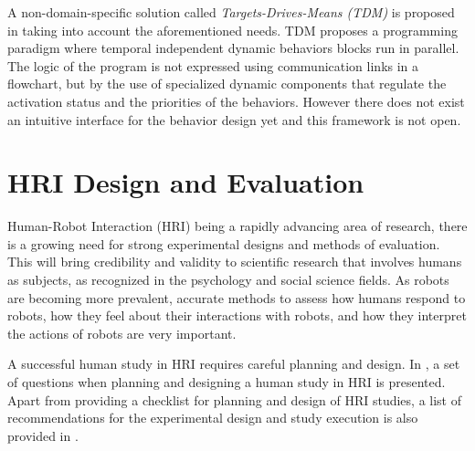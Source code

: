 A non-domain-specific solution called \emph{Targets-Drives-Means (TDM)} is proposed in \cite{berenz2014targets} taking into account the aforementioned needs. TDM proposes a programming paradigm where temporal independent dynamic behaviors blocks run in parallel. The logic of the program is not expressed using communication links in a flowchart, but by the use of specialized dynamic components that regulate the activation status and the priorities of the behaviors. However there does not exist an intuitive interface for the behavior design yet and this framework is not open.
\section{HRI Design and Evaluation} %
Human-Robot Interaction (HRI) being a rapidly advancing area of research, there is a growing need for strong experimental designs and methods of evaluation. This will bring credibility and validity to scientific research that involves humans as subjects, as recognized in the psychology and social science fields. As robots are becoming more prevalent, accurate methods to assess how humans respond to robots, how they feel about their interactions with robots, and how they interpret the actions of robots are very important. 

A successful human study in HRI requires careful planning and design. In \cite{bethel2010review}, a set of questions when planning and designing a human study in HRI is presented. Apart from providing a checklist for planning and design of HRI studies, a list of recommendations for the experimental design and study execution is also provided in \cite{bethel2010review}.
	
